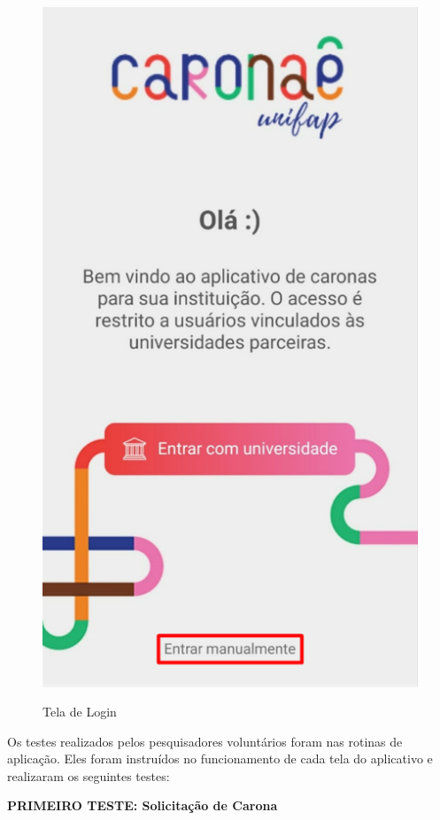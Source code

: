 \begin{figure}[H]
	\centering
	\caption{Tela de Login}
	\includegraphics[scale=0.3]{./04-figuras/teLa_de_login.png}
	\label{fig:tela_inicial_caronae}
\end{figure}

Os testes realizados pelos pesquisadores voluntários foram nas rotinas de aplicação. Eles foram instruídos no funcionamento de cada tela do aplicativo e realizaram os seguintes testes:

\textbf{PRIMEIRO TESTE: Solicitação de Carona}

